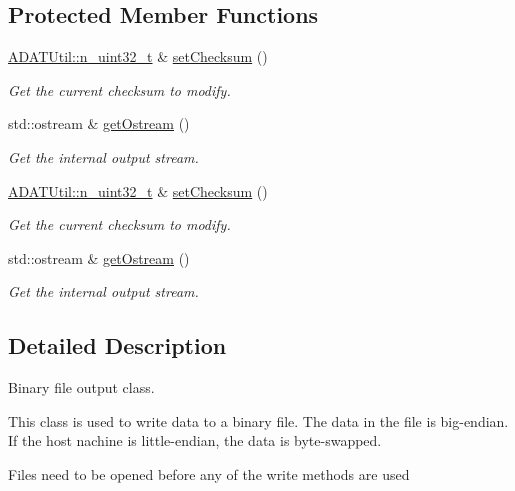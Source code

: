 \subsection*{Protected Member Functions}
\begin{DoxyCompactItemize}
\item 
\mbox{\hyperlink{namespaceADATUtil_ad945a8afa4db2d1f89b731964adae97e}{A\+D\+A\+T\+Util\+::n\+\_\+uint32\+\_\+t}} \& \mbox{\hyperlink{classADATIO_1_1BinaryFileWriter_a0137ec5926d08e49ed7a63c6ef33e882}{set\+Checksum}} ()
\begin{DoxyCompactList}\small\item\em Get the current checksum to modify. \end{DoxyCompactList}\item 
std\+::ostream \& \mbox{\hyperlink{classADATIO_1_1BinaryFileWriter_a2506200a774d4823088a0365e0452d9a}{get\+Ostream}} ()
\begin{DoxyCompactList}\small\item\em Get the internal output stream. \end{DoxyCompactList}\item 
\mbox{\hyperlink{namespaceADATUtil_ad945a8afa4db2d1f89b731964adae97e}{A\+D\+A\+T\+Util\+::n\+\_\+uint32\+\_\+t}} \& \mbox{\hyperlink{classADATIO_1_1BinaryFileWriter_a0137ec5926d08e49ed7a63c6ef33e882}{set\+Checksum}} ()
\begin{DoxyCompactList}\small\item\em Get the current checksum to modify. \end{DoxyCompactList}\item 
std\+::ostream \& \mbox{\hyperlink{classADATIO_1_1BinaryFileWriter_a2506200a774d4823088a0365e0452d9a}{get\+Ostream}} ()
\begin{DoxyCompactList}\small\item\em Get the internal output stream. \end{DoxyCompactList}\end{DoxyCompactItemize}


\subsection{Detailed Description}
Binary file output class. 

This class is used to write data to a binary file. The data in the file is big-\/endian. If the host nachine is little-\/endian, the data is byte-\/swapped.

Files need to be opened before any of the write methods are used

